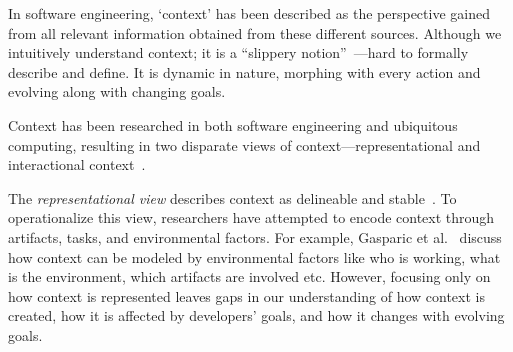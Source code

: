 
In software engineering, `context' has been described as the perspective gained from all relevant information obtained from these different sources. Although we intuitively understand context; it is a ``slippery notion''~\cite{Dourish:2004}---hard to formally describe and define. It is dynamic in nature, morphing with every action and evolving along with changing goals. 

Context has been researched in both software engineering and ubiquitous computing, resulting in two disparate views of context---representational and interactional context~\cite{Dourish:2004}.

The \textit{representational view} describes context as delineable and stable~\cite{Schilit:1994a,Abowd:1999,Pascoe:1998}. To operationalize this view, researchers have attempted to encode context through artifacts, tasks, and environmental factors. For example, Gasparic et al.~\cite{Gasparic:2017} discuss how context can be modeled by environmental factors like who is working, what is the environment, which artifacts are involved etc.
However, focusing only on how context is represented leaves gaps in our understanding of how context is created, how it is affected by developers' goals, and how it changes with evolving goals. 

